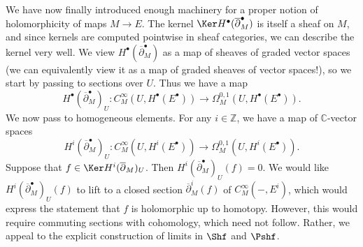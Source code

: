 \begin{discussion}
	We have now finally introduced enough machinery for a proper notion of holomorphicity of maps $M\to E$. The kernel $\Ker H^{\bullet} (\overline{\partial } ^{\bullet}_M)$ is itself a sheaf on $M$, and since kernels are computed pointwise in sheaf categories, we can describe the kernel very well. We view $H^{\bullet} (\overline{\partial } ^{\bullet} _M)$ as a map of sheaves of graded vector spaces (we can equivalently view it as a map of graded sheaves of vector spaces!), so we start by passing to sections over $U$. Thus we have a map
	\[
		H^{\bullet} (\overline{\partial }^{\bullet} _M)_U : C^\infty_{M}(U,H^{\bullet} (E^{\bullet} ))  \to \Omega ^{0,1} _M(U,H^{\bullet} (E^{\bullet} ))
	.\]
	We now pass to homogeneous elements. For any $i\in\mathbb{Z} $, we have a map of $\mathbb{C} $-vector spaces
	\[
		H^i(\overline{\partial }^{\bullet} _M)_U : C^\infty_{M}(U,H^i(E^{\bullet} ))  \to \Omega ^{0,1} _M(U,H^i(E^{\bullet} ))
	.\]
	Suppose that $f\in \Ker H^i (\overline{\partial } _M)_U$. Then $H^i(\overline{\partial }^{\bullet} _M)_U(f) = 0$. We would like $H^i(\overline{\partial } ^{\bullet} _M)_U(f)$ to lift to a closed section $\overline{\partial } ^{i}_M(f)$ of $C^\infty_{M}(-,E^i) $, which would express the statement that $f$ is holomorphic up to homotopy. However, this would require commuting sections with cohomology, which need not follow. Rather, we appeal to the explicit construction of limits in $\Shf $ and $\Pshf $.


\end{discussion}
